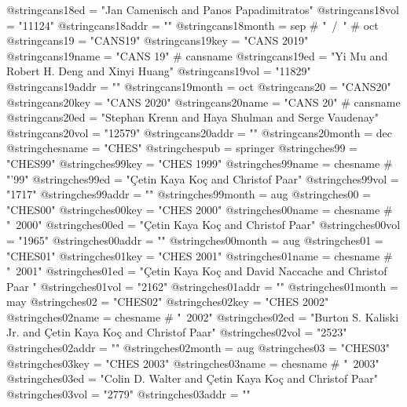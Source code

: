 @string{cans18ed =              "Jan Camenisch and Panos Papadimitratos"}
@string{cans18vol =             "11124"}
@string{cans18addr =            ""}
@string{cans18month =           sep # "~/~" # oct}
@string{cans19 =                "CANS19"}
@string{cans19key =             "CANS 2019"}
@string{cans19name =            "CANS 19" # cansname}
@string{cans19ed =              "Yi Mu and Robert H. Deng and Xinyi Huang"}
@string{cans19vol =             "11829"}
@string{cans19addr =            ""}
@string{cans19month =           oct}
@string{cans20 =                "CANS20"}
@string{cans20key =             "CANS 2020"}
@string{cans20name =            "CANS 20" # cansname}
@string{cans20ed =              "Stephan Krenn and Haya Shulman and Serge Vaudenay"}
@string{cans20vol =             "12579"}
@string{cans20addr =            ""}
@string{cans20month =           dec}
@string{chesname =              "CHES"}
@string{chespub =               springer}
@string{ches99 =                "CHES99"}
@string{ches99key =             "CHES 1999"}
@string{ches99name =            chesname # "'99"}
@string{ches99ed =              "{\c{C}etin Kaya} Ko\c{c} and Christof Paar"}
@string{ches99vol =             "1717"}
@string{ches99addr =            ""}
@string{ches99month =           aug}
@string{ches00 =                "CHES00"}
@string{ches00key =             "CHES 2000"}
@string{ches00name =            chesname # "~2000"}
@string{ches00ed =              "{\c{C}etin Kaya} Ko\c{c} and Christof Paar"}
@string{ches00vol =             "1965"}
@string{ches00addr =            ""}
@string{ches00month =           aug}
@string{ches01 =                "CHES01"}
@string{ches01key =             "CHES 2001"}
@string{ches01name =            chesname # "~2001"}
@string{ches01ed =              "{\c{C}etin Kaya} Ko\c{c} and David Naccache and Christof Paar "}
@string{ches01vol =             "2162"}
@string{ches01addr =            ""}
@string{ches01month =           may}
@string{ches02 =                "CHES02"}
@string{ches02key =             "CHES 2002"}
@string{ches02name =            chesname # "~2002"}
@string{ches02ed =              "Burton S. {Kaliski Jr.} and {\c{C}etin Kaya} Ko\c{c} and Christof Paar"}
@string{ches02vol =             "2523"}
@string{ches02addr =            ""}
@string{ches02month =           aug}
@string{ches03 =                "CHES03"}
@string{ches03key =             "CHES 2003"}
@string{ches03name =            chesname # "~2003"}
@string{ches03ed =              "Colin D. Walter and {\c{C}etin Kaya} Ko\c{c} and Christof Paar"}
@string{ches03vol =             "2779"}
@string{ches03addr =            ""}
